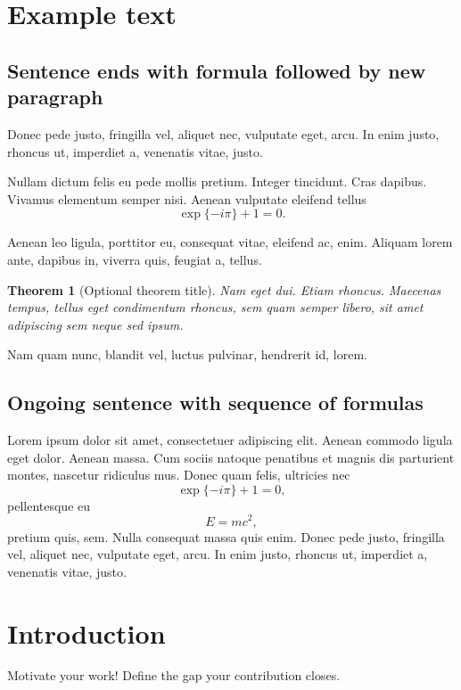 \documentclass[
	12pt, %
	a4paper, %
	]{article}
\theoremstyle{break} %
\newtheorem{theorem}{Theorem}
\begin{document}
\pagebreak \newpage

\setcounter{page}{2}
\onehalfspacing

\section{Example text}\label{sec:examples}
\subsection{Sentence ends with formula followed by new paragraph}
Donec pede justo, fringilla vel, aliquet nec, vulputate eget, arcu. In enim justo, rhoncus ut, imperdiet a, venenatis vitae, justo. 

Nullam dictum felis eu pede mollis pretium. Integer tincidunt. Cras dapibus. Vivamus elementum semper nisi. Aenean vulputate eleifend tellus
\begin{equation}
\exp\{-i\pi\} + 1 = 0.
\end{equation}

Aenean leo ligula, porttitor eu, consequat vitae, eleifend ac, enim. Aliquam lorem ante, dapibus in, viverra quis, feugiat a, tellus.
\begin{theorem}[Optional theorem title]
	Nam eget dui. Etiam rhoncus. Maecenas tempus, tellus eget condimentum rhoncus, sem quam semper libero, sit amet adipiscing sem neque sed ipsum.
\end{theorem} Nam quam nunc, blandit vel, luctus pulvinar, hendrerit id, lorem.

\subsection{Ongoing sentence  with sequence of formulas}
Lorem ipsum dolor sit amet, consectetuer adipiscing elit. Aenean commodo ligula eget dolor. Aenean massa. Cum sociis natoque penatibus et magnis dis parturient montes, nascetur ridiculus mus. Donec quam felis, ultricies nec
\begin{equation}
\exp\{-i\pi\} + 1 = 0,
\end{equation}
pellentesque eu
\begin{equation}
E = m c^2,
\end{equation}
pretium quis, sem. Nulla consequat massa quis enim. Donec pede justo, fringilla vel, aliquet nec, vulputate eget, arcu. In enim justo, rhoncus ut, imperdiet a, venenatis vitae, justo.

\section{Introduction} \label{sec:introduction}
Motivate your work! Define the gap your contribution closes.
\end{document}
